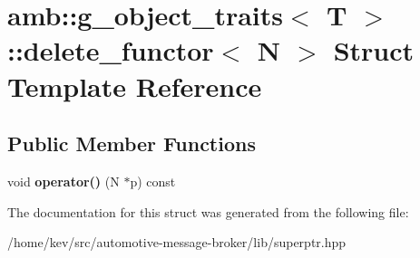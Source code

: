 \hypertarget{structamb_1_1g__object__traits_3_01T_01_4_1_1delete__functor_3_01N_01_4}{\section{amb\+:\+:g\+\_\+object\+\_\+traits$<$ T $>$\+:\+:delete\+\_\+functor$<$ N $>$ Struct Template Reference}
\label{structamb_1_1g__object__traits_3_01T_01_4_1_1delete__functor_3_01N_01_4}
}
\subsection*{Public Member Functions}
\begin{DoxyCompactItemize}
\item 
\hypertarget{structamb_1_1g__object__traits_3_01T_01_4_1_1delete__functor_3_01N_01_4_a012069d927a1aaadf1694324a6fb3233}{void {\bfseries operator()} (N $\ast$p) const }\label{structamb_1_1g__object__traits_3_01T_01_4_1_1delete__functor_3_01N_01_4_a012069d927a1aaadf1694324a6fb3233}

\end{DoxyCompactItemize}


The documentation for this struct was generated from the following file\+:\begin{DoxyCompactItemize}
\item 
/home/kev/src/automotive-\/message-\/broker/lib/superptr.\+hpp\end{DoxyCompactItemize}
